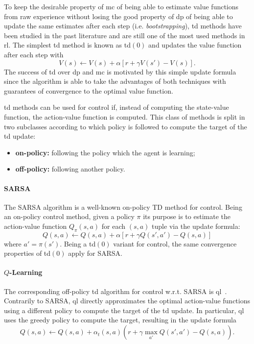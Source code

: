 To keep the desirable property of \gls{mc} of being able to estimate value functions from raw experience without losing the good property of \gls{dp} of being able to update the same estimates after each step (i.e. \textit{bootstrapping}), \gls{td} methods have been studied in the past literature and are still one of the most used methods in \gls{rl}. The simplest \gls{td} method is known as \gls{td}$(0)$ and updates the value function after each step with
\begin{equation}
 V(s) \gets V(s) + \alpha [r + \gamma V(s') - V(s)].
\end{equation}
The success of \gls{td} over \gls{dp} and \gls{mc} is motivated by this simple update formula since the algorithm is able to take the advantages of both techniques with guarantees of convergence to the optimal value function.

\gls{td} methods can be used for control if, instead of computing the state-value function, the action-value function is computed. This class of methods is split in two subclasses according to which policy is followed to compute the target of the \gls{td} update:
\begin{itemize}
 \item \textbf{on-policy:} following the policy which the agent is learning;
 \item \textbf{off-policy:} following another policy.
\end{itemize}

\paragraph{SARSA}\label{S:SARSA}
The SARSA algorithm is a well-known on-policy TD method for control. Being an on-policy control method, given a policy $\pi$ its purpose is to estimate the action-value function $Q_\pi(s,a)$ for each $(s,a)$ tuple via the update formula:
\begin{equation}
 Q(s,a) \gets Q(s,a) + \alpha [r + \gamma Q(s',a') - Q(s,a)]
\end{equation}
where $a' = \pi(s')$. Being a \gls{td}$(0)$ variant for control, the same convergence properties of \gls{td}$(0)$ apply for SARSA.
\paragraph{$Q$-Learning}\label{S:Q-Learning}
The corresponding off-policy \gls{td} algorithm for control w.r.t. SARSA is \gls{ql}~\cite{watkins1989learning}. Contrarily to SARSA, \gls{ql} directly approximates the optimal action-value functions using a different policy to compute the target of the \gls{td} update. In particular, \gls{ql} uses the greedy policy to compute the target, resulting in the update formula
\begin{equation}\label{eq:Q-formula}
 Q(s,a) \gets Q(s,a) + \alpha_t(s,a) \left(r + \gamma \max_{a'} Q(s',a') - Q(s,a)\right).
\end{equation}

